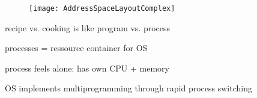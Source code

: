 \begin{figure}[H]\centering\label{AddressSpaceLayoutComplex}\texttt{[image: AddressSpaceLayoutComplex]}\end{figure}

\begin{summary}
	\begin{items}
		\setlength\itemsep{0em}
		\item recipe vs. cooking is like program vs. process
		\item processes = ressource container for OS
		\item process feels alone: has own CPU + memory
		\item OS implements multiprogramming through rapid process switching
	\end{items}
\end{summary}